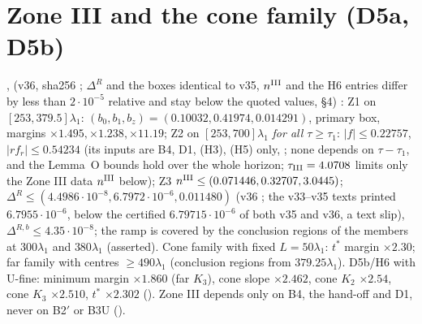 \documentclass[11pt]{article}
\begin{document}
\section{Zone III and the cone family (D5a, D5b)}\label{M:sec:zone3}
,  (v36, sha256 ; $\Delta^R$ and the boxes identical to v35, $n^{\rm III}$ and the H6 entries differ by less than $2\cdot10^{-5}$ relative and stay below the quoted values,  \S4) \tC: Z1 on $[253,379.5]\lambda_1$: $(b_0,b_1,b_z)=(0.10032,0.41974,0.014291)$, primary box, margins $\times1.495,\times1.238,\times11.19$; Z2 on $[253,700]\lambda_1$ \emph{for all $\tau\ge\tau_1$}: $|f|\le0.22757$, $|rf_r|\le0.54234$ (its inputs are B4, D1, (H3), (H5) only, ; none depends on $\tau-\tau_1$, and the Lemma~O bounds hold over the whole horizon; $\tau_{\rm III}=4.0708$ limits only the Zone III data $n^{\rm III}$ below); Z3 $n^{\rm III}\le(0.071446,0.32707,3.0445)$; $\Delta^R\le(4.4986\cdot10^{-8},6.7972\cdot10^{-6},0.011480)$ (v36 ; the v33--v35 texts printed $6.7955\cdot10^{-6}$, below the certified $6.79715\cdot10^{-6}$ of both v35 and v36, a text slip), $\Delta^{R,b}\le4.35\cdot10^{-8}$; the ramp is covered by the conclusion regions of the members at $300\lambda_1$ and $380\lambda_1$ (asserted). Cone family with fixed $L=50\lambda_1$: $t^*$ margin $\times2.30$; far family with centres $\ge490\lambda_1$ (conclusion regions from $379.25\lambda_1$). D5b/H6 with U-fine: minimum margin $\times1.860$ (far $K_3$), cone slope $\times2.462$, cone $K_2$ $\times2.54$, cone $K_3$ $\times2.510$, $t^*$ $\times2.302$ (). Zone III depends only on B4, the hand-off and D1, never on B2$'$ or B3U ().

\end{document}
